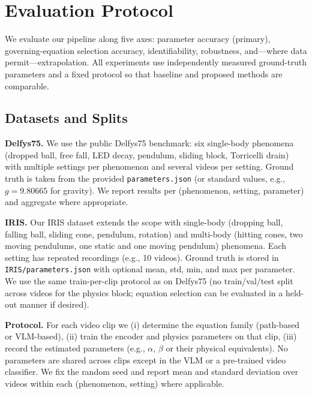
\section{Evaluation Protocol}
\label{sec:eval_protocol}

We evaluate our pipeline along five axes: parameter accuracy (primary), governing-equation selection accuracy, identifiability, robustness, and—where data permit—extrapolation. All experiments use independently measured ground-truth parameters and a fixed protocol so that baseline and proposed methods are comparable.

\subsection{Datasets and Splits}
\label{sec:eval_datasets}

\textbf{Delfys75.} We use the public Delfys75 benchmark: six single-body phenomena (dropped ball, free fall, LED decay, pendulum, sliding block, Torricelli drain) with multiple settings per phenomenon and several videos per setting. Ground truth is taken from the provided \texttt{parameters.json} (or standard values, e.g., $g = 9.80665$ for gravity). We report results per (phenomenon, setting, parameter) and aggregate where appropriate.

\textbf{IRIS.} Our IRIS dataset extends the scope with single-body (dropping ball, falling ball, sliding cone, pendulum, rotation) and multi-body (hitting cones, two moving pendulums, one static and one moving pendulum) phenomena. Each setting has repeated recordings (e.g., 10 videos). Ground truth is stored in \texttt{IRIS/parameters.json} with optional mean, std, min, and max per parameter. We use the same train-per-clip protocol as on Delfys75 (no train/val/test split across videos for the physics block; equation selection can be evaluated in a held-out manner if desired).

\textbf{Protocol.} For each video clip we (i) determine the equation family (path-based or VLM-based), (ii) train the encoder and physics parameters on that clip, (iii) record the estimated parameters (e.g., $\alpha$, $\beta$ or their physical equivalents). No parameters are shared across clips except in the VLM or a pre-trained video classifier. We fix the random seed and report mean and standard deviation over videos within each (phenomenon, setting) where applicable.

